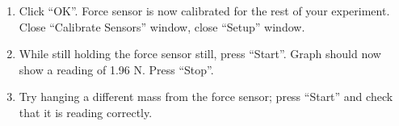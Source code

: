 \begin{enumerate}
\item Click ``OK''. Force sensor is now calibrated for the rest of your experiment. Close ``Calibrate Sensors'' window, close ``Setup'' window.

\item While still holding the force sensor still, press ``Start''. Graph should now show a reading of 1.96 N. Press ``Stop''.

\item Try hanging a different mass from the force sensor; press ``Start'' and check that it is reading correctly.
\end{enumerate}
